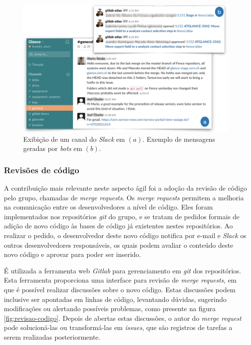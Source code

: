 \begin{figure}[H]
    \centering
    \includegraphics[width=15cm]{source/4-solucao/images/slack-example.png}
    \caption{Exibição de um canal do \emph{Slack} em $(a)$. Exemplo de mensagens geradas por \emph{bots} em $(b)$. }
    \label{fig:slack-example}
\end{figure}

\hypertarget{revisoes-de-codigo}{%
\subsubsection{Revisões de código}\label{revisoes-de-codigo}}

A contribuição mais relevante neste aspecto ágil foi a adoção da revisão de código pelo grupo, chamadas de \emph{merge requests}. Os \emph{merge requests} permitem a melhoria na comunicação entre os desenvolvedores a nível de código. Eles foram implementados nos repositórios \emph{git} do grupo, e se tratam de pedidos formais de adição de novo código às bases de código já existentes nestes repositórios. Ao realizar o pedido, o desenvolvedor deste novo código notifica por e-mail e \emph{Slack} os outros desenvolvedores responsáveis, os quais podem avaliar o conteúdo deste novo código e aprovar para poder ser inserido.

É utilizada a ferramenta web \emph{Gitlab} para gerenciamento em \emph{git} dos repositórios. Esta ferramenta proporciona uma interface para revisão de \emph{merge requests}, em que é possível realizar discussões sobre o novo código. Estas discussões podem inclusive ser apontadas em linhas de código, levantando dúvidas, sugerindo modificações ou alertando possíveis problemas, como presente na figura \ref{fig:revisao-codigo}. Depois de abertas estas discussões, o autor do \emph{merge request} pode solucioná-las ou transformá-las em \emph{issues}, que são registros de tarefas a serem realizadas posteriormente.

